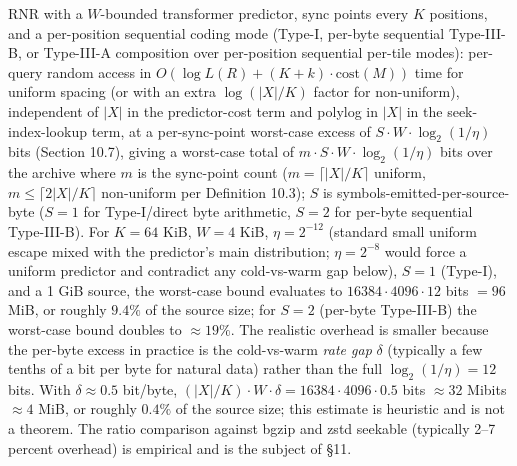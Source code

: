 \documentclass[
]{article}
\begin{document}
RNR with a $W$-bounded transformer predictor, sync points every
$K$ positions, and a per-position sequential coding mode (Type-I,
per-byte sequential Type-III-B, or Type-III-A composition over
per-position sequential per-tile modes): per-query random access
in $O(\log L(R) + (K + k) \cdot \mathrm{cost}(M))$ time for uniform
spacing (or with an extra $\log(|X|/K)$ factor for non-uniform),
independent of $|X|$ in the predictor-cost term and polylog in
$|X|$ in the seek-index-lookup term, at a per-sync-point
worst-case excess of $S \cdot W \cdot \log_2(1/\eta)$ bits
(Section 10.7), giving a worst-case total of $m \cdot S \cdot W
\cdot \log_2(1/\eta)$ bits over the archive where $m$ is the
sync-point count ($m = \lceil |X|/K \rceil$ uniform, $m \leq \lceil
2|X|/K \rceil$ non-uniform per Definition 10.3); $S$ is
symbols-emitted-per-source-byte ($S = 1$ for Type-I/direct byte
arithmetic, $S = 2$ for per-byte sequential Type-III-B). For
$K = 64$ KiB, $W = 4$ KiB, $\eta = 2^{-12}$ (standard small
uniform escape mixed with the predictor's main distribution;
$\eta = 2^{-8}$ would force a uniform predictor and contradict
any cold-vs-warm gap below), $S = 1$ (Type-I), and a 1 GiB source,
the worst-case bound evaluates to $16384 \cdot 4096 \cdot 12$
bits $= 96$ MiB, or roughly $9.4\%$ of the source size; for $S = 2$
(per-byte Type-III-B) the worst-case bound doubles to $\approx
19\%$. The realistic overhead is smaller because the
per-byte excess in practice is the cold-vs-warm \emph{rate gap}
$\delta$ (typically a few tenths of a bit per byte for natural
data) rather than the full $\log_2(1/\eta) = 12$ bits. With
$\delta \approx 0.5$ bit/byte, $(|X|/K) \cdot W \cdot \delta =
16384 \cdot 4096 \cdot 0.5$ bits $\approx 32$ Mibits $\approx 4$
MiB, or roughly $0.4\%$ of the source size; this estimate is
heuristic and is not a theorem. The ratio comparison
against bgzip and zstd seekable (typically 2--7 percent overhead)
is empirical and is the subject of §11.
\end{document}

